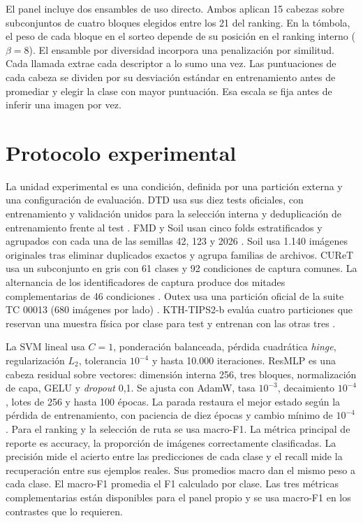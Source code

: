 \documentclass[a4paper,fleqn]{cas-sc}
\begin{document}
El panel incluye dos ensambles de uso directo. Ambos aplican 15 cabezas sobre subconjuntos de cuatro bloques elegidos entre los 21 del ranking. En la tómbola, el peso de cada bloque en el sorteo depende de su posición en el ranking interno ($\beta=8$). El ensamble por diversidad incorpora una penalización por similitud. Cada llamada extrae cada descriptor a lo sumo una vez. Las puntuaciones de cada cabeza se dividen por su desviación estándar en entrenamiento antes de promediar y elegir la clase con mayor puntuación. Esa escala se fija antes de inferir una imagen por vez.

\section{Protocolo experimental}

La unidad experimental es una condición, definida por una partición externa y una configuración de evaluación. DTD usa sus diez tests oficiales, con entrenamiento y validación unidos para la selección interna y deduplicación de entrenamiento frente al test \citep{cimpoi2014dtd}. FMD y Soil usan cinco folds estratificados y agrupados con cada una de las semillas 42, 123 y 2026 \citep{sharan2013fmd}. Soil usa 1.140 imágenes originales tras eliminar duplicados exactos y agrupa familias de archivos. CUReT usa un subconjunto en gris con 61 clases y 92 condiciones de captura comunes. La alternancia de los identificadores de captura produce dos mitades complementarias de 46 condiciones \citep{varma2003filter}. Outex usa una partición oficial de la suite TC 00013 (680 imágenes por lado) \citep{ojala2002outex}. KTH-TIPS2-b evalúa cuatro particiones que reservan una muestra física por clase para test y entrenan con las otras tres \citep{mallikarjuna2005kth,scabini2023radam}.

La SVM lineal usa $C=1$, ponderación balanceada, pérdida cuadrática \emph{hinge}, regularización $L_2$, tolerancia $10^{-4}$ y hasta 10.000 iteraciones. ResMLP es una cabeza residual sobre vectores: dimensión interna 256, tres bloques, normalización de capa, GELU y \emph{dropout} 0,1. Se ajusta con AdamW, tasa $10^{-3}$, decaimiento $10^{-4}$, lotes de 256 y hasta 100 épocas. La parada restaura el mejor estado según la pérdida de entrenamiento, con paciencia de diez épocas y cambio mínimo de $10^{-4}$. Para el ranking y la selección de ruta se usa macro-F1. La métrica principal de reporte es accuracy, la proporción de imágenes correctamente clasificadas. La precisión mide el acierto entre las predicciones de cada clase y el recall mide la recuperación entre sus ejemplos reales. Sus promedios macro dan el mismo peso a cada clase. El macro-F1 promedia el F1 calculado por clase. Las tres métricas complementarias están disponibles para el panel propio y se usa macro-F1 en los contrastes que lo requieren.
\end{document}

